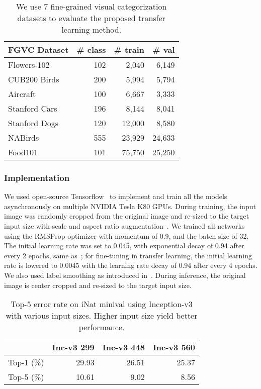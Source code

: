 \documentclass[10pt,twocolumn,letterpaper]{article}
\begin{document}
\begin{table}[t]
\small
\begin{center}
\begin{tabular}{ |l|r|r|r| } 
\hline
FGVC Dataset & \# class & \# train & \# val \\ \hline 
Flowers-102~\cite{flower_102} & 102 & 2,040 & 6,149 \\
CUB200 Birds~\cite{cub200}   & 200 & 5,994 & 5,794 \\
Aircraft~\cite{airplane}       & 100 & 6,667 & 3,333 \\
Stanford Cars~\cite{stanford_car}  & 196 & 8,144 & 8,041 \\
Stanford Dogs~\cite{stanford_dog}  & 120 & 12,000 & 8,580 \\
NABirds~\cite{nabirds}        & 555 & 23,929 & 24,633 \\
Food101~\cite{food101}        & 101 & 75,750 & 25,250 \\ \hline
\end{tabular}
\end{center}
\caption{We use 7 fine-grained visual categorization datasets to evaluate the proposed transfer learning method.}
\label{tab:fgvc_dataset}
\end{table}


\subsubsection{Implementation}
\label{sec:exp_implementation}

We used open-source Tensorflow~\cite{tensorflow} to implement and train all the models asynchronously on multiple NVIDIA Tesla K80 GPUs.
During training, the input image was randomly cropped from the original image and re-sized to the target input size with scale and aspect ratio augmentation~\cite{googlenet}.
We trained all networks using the RMSProp optimizer with momentum of 0.9, and the batch size of 32.
The initial learning rate was set to 0.045, with exponential decay of 0.94 after every 2 epochs, same as~\cite{googlenet}; for fine-tuning in transfer learning, the initial learning rate is lowered to 0.0045 with the learning rate decay of 0.94 after every 4 epochs.
We also used label smoothing as introduced in~\cite{inception-v3}.
During inference, the original image is center cropped and re-sized to the target input size.




\begin{table}[t]
\small
\begin{center}
\begin{tabular}{ l|r|r|r }
\hline
& \textbf{Inc-v3 299} & \textbf{Inc-v3 448} & \textbf{Inc-v3 560} \\ \hline
Top-1 (\%) & 29.93 & 26.51 & 25.37 \\
Top-5 (\%) & 10.61 & 9.02 & 8.56 \\ \hline
\end{tabular}
\end{center}
\caption{Top-5 error rate on iNat minival using Inception-v3 with various input sizes. Higher input size yield better performance.}
\label{tab:input_size}
\end{table}
\end{document}

